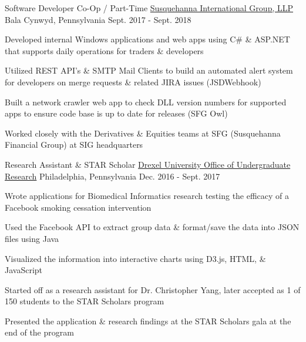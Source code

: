 \begin{cventries}
  \cventry
    {Software Developer Co-Op / Part-Time} %
    {\href{https://sig.com/}{Susquehanna International Group, LLP}} %
    {Bala Cynwyd, Pennsylvania} %
    {Sept. 2017 - Sept. 2018} %
    {
      \begin{cvitems} %
        \item Developed internal Windows applications and web apps using C\# \& ASP.NET that supports daily operations for traders \& developers
        \item Utilized REST API's \& SMTP Mail Clients to build an automated alert system for developers on merge requests \& related JIRA issues (JSDWebhook)
        \item Built a network crawler web app to check DLL version numbers for supported apps to ensure code base is up to date for releases (SFG Owl)
        \item Worked closely with the Derivatives \& Equities teams at SFG (Susquehanna Financial Group) at SIG headquarters
      \end{cvitems}
    }

  \cventry
    {Research Assistant \& STAR Scholar} %
    {\href{https://drexel.edu/pennoni/urep/undergraduate-research/}{Drexel University Office of Undergraduate Research}} %
    {Philadelphia, Pennsylvania} %
    {Dec. 2016 - Sept. 2017} %
    {
      \begin{cvitems} %
        \item Wrote applications for Biomedical Informatics research testing the efficacy of a Facebook smoking cessation intervention
        \item Used the Facebook API to extract group data \& format/save the data into JSON files using Java
        \item Visualized the information into interactive charts using D3.js, HTML, \& JavaScript
        \item Started off as a research assistant for Dr. Christopher Yang, later accepted as 1 of 150 students to the STAR Scholars program
        \item Presented the application \& research findings at the STAR Scholars gala at the end of the program
      \end{cvitems}
    }

\end{cventries}
